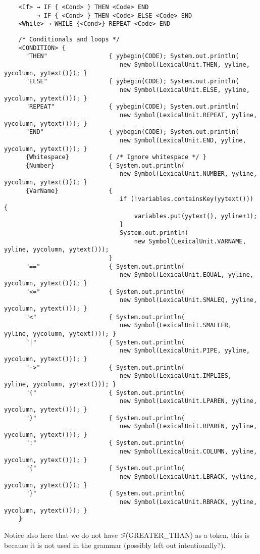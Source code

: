 \documentclass{article}
\begin{document}
	\begin{verbatim}
	<If> → IF { <Cond> } THEN <Code> END
		 → IF { <Cond> } THEN <Code> ELSE <Code> END
	<While> → WHILE {<Cond>} REPEAT <Code> END
	\end{verbatim}

	\begin{verbatim}
	/* Conditionals and loops */
	<CONDITION> {
	  "THEN"                 { yybegin(CODE); System.out.println(
								new Symbol(LexicalUnit.THEN, yyline, yycolumn, yytext())); }
	  "ELSE"                 { yybegin(CODE); System.out.println(
								new Symbol(LexicalUnit.ELSE, yyline, yycolumn, yytext())); }
	  "REPEAT"               { yybegin(CODE); System.out.println(
								new Symbol(LexicalUnit.REPEAT, yyline, yycolumn, yytext())); }
	  "END"                  { yybegin(CODE); System.out.println(
								new Symbol(LexicalUnit.END, yyline, yycolumn, yytext())); }
	  {Whitespace}           { /* Ignore whitespace */ }
	  {Number}               { System.out.println(
								new Symbol(LexicalUnit.NUMBER, yyline, yycolumn, yytext())); }
	  {VarName}              {
								if (!variables.containsKey(yytext())) {
									variables.put(yytext(), yyline+1);
								}
								System.out.println(
									new Symbol(LexicalUnit.VARNAME, yyline, yycolumn, yytext()));
							 }
	  "=="                   { System.out.println(
								new Symbol(LexicalUnit.EQUAL, yyline, yycolumn, yytext())); }
	  "<="                   { System.out.println(
								new Symbol(LexicalUnit.SMALEQ, yyline, yycolumn, yytext())); }
	  "<"                    { System.out.println(
								new Symbol(LexicalUnit.SMALLER, yyline, yycolumn, yytext())); }
	  "|"                    { System.out.println(
								new Symbol(LexicalUnit.PIPE, yyline, yycolumn, yytext())); }
	  "->"                   { System.out.println(
								new Symbol(LexicalUnit.IMPLIES, yyline, yycolumn, yytext())); }
	  "("                    { System.out.println(
								new Symbol(LexicalUnit.LPAREN, yyline, yycolumn, yytext())); }
	  ")"                    { System.out.println(
								new Symbol(LexicalUnit.RPAREN, yyline, yycolumn, yytext())); }
	  ":"                    { System.out.println(
								new Symbol(LexicalUnit.COLUMN, yyline, yycolumn, yytext())); }
	  "{"                    { System.out.println(
								new Symbol(LexicalUnit.LBRACK, yyline, yycolumn, yytext())); }
	  "}"                    { System.out.println(
								new Symbol(LexicalUnit.RBRACK, yyline, yycolumn, yytext())); }
	}
	\end{verbatim}
	Notice also here that we do not have \">\" (GREATER\_THAN) as a token, this is because it is not used in the grammar (possibly left out intentionally?).\\
\end{document}
